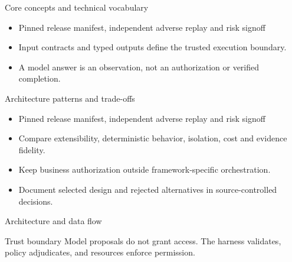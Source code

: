 \documentclass[aspectratio=169,10pt]{beamer}
\begin{document}
\begin{frame}{Core concepts and technical vocabulary}
\small
\begin{itemize}
\item Pinned release manifest, independent adverse replay and risk signoff
\item Input contracts and typed outputs define the trusted execution boundary.
\item A model answer is an observation, not an authorization or verified completion.
\end{itemize}

\end{frame}

\begin{frame}{Architecture patterns and trade-offs}
\small
\begin{itemize}
\item Pinned release manifest, independent adverse replay and risk signoff
\item Compare extensibility, deterministic behavior, isolation, cost and evidence fidelity.
\item Keep business authorization outside framework-specific orchestration.
\item Document selected design and rejected alternatives in source-controlled decisions.
\end{itemize}

\end{frame}

\begin{frame}{Architecture and data flow}
\small
\centering
{}
\vspace{0.6cm}
\begin{block}{Trust boundary}
Model proposals do not grant access. The harness validates, policy adjudicates, and resources enforce permission.
\end{block}
\end{frame}
\end{document}
